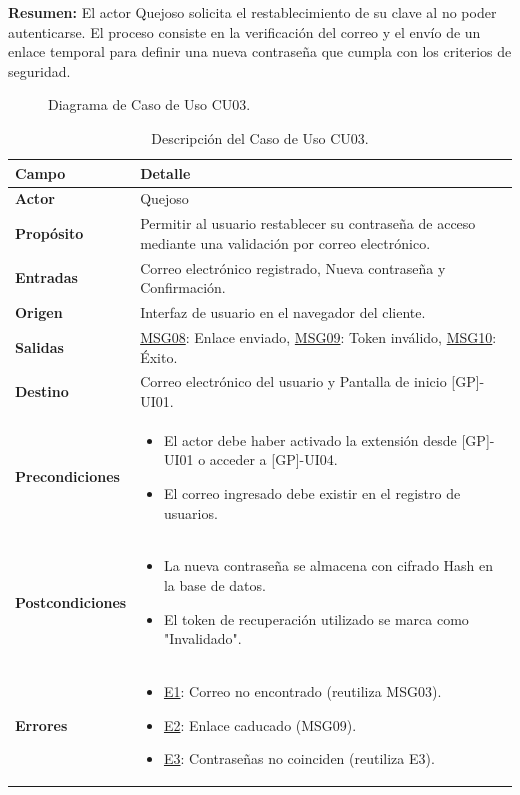 \begin{appendices}
\textbf{Resumen:} 
El actor Quejoso solicita el restablecimiento de su clave al no poder autenticarse. El proceso consiste en la verificación del correo y el envío de un enlace temporal para definir una nueva contraseña que cumpla con los criterios de seguridad.

\begin{figure}[htbp]
    \centering
    \figCUtres
    \caption{Diagrama de Caso de Uso CU03.}
    \label{fig:cu03}
\end{figure}

\begin{table}[htbp]
\centering
\small
\begin{tabular}{|p{3.5cm}|p{10.5cm}|}
\hline
\rowcolor[HTML]{EFEFEF} 
\textbf{Campo} & \textbf{Detalle} \\ \hline
\textbf{Actor} & Quejoso \\ \hline
\textbf{Propósito} & Permitir al usuario restablecer su contraseña de acceso mediante una validación por correo electrónico. \\ \hline
\textbf{Entradas} & Correo electrónico registrado, Nueva contraseña y Confirmación. \\ \hline
\textbf{Origen} & Interfaz de usuario en el navegador del cliente. \\ \hline
\textbf{Salidas} & \hyperlink{msg:MSG08}{MSG08}: Enlace enviado, \hyperlink{msg:MSG09}{MSG09}: Token inválido, \hyperlink{msg:MSG10}{MSG10}: Éxito. \\ \hline
\textbf{Destino} & Correo electrónico del usuario y Pantalla de inicio [GP]-UI01. \\ \hline
\textbf{Precondiciones} & 
\begin{itemize}[nosep, leftmargin=*]
    \item El actor debe haber activado la extensión desde [GP]-UI01 o acceder a [GP]-UI04.
    \item El correo ingresado debe existir en el registro de usuarios.
\end{itemize} \\ \hline
\textbf{Postcondiciones} & 
\begin{itemize}[nosep, leftmargin=*]
    \item La nueva contraseña se almacena con cifrado Hash en la base de datos.
    \item El token de recuperación utilizado se marca como "Invalidado".
\end{itemize} \\ \hline
\textbf{Errores} & 
\begin{itemize}[nosep, leftmargin=*]
    \item \hyperlink{msg:MSG03}{E1}: Correo no encontrado (reutiliza MSG03).
    \item \hyperlink{err:E6}{E2}: Enlace caducado (MSG09).
    \item \hyperlink{err:E3}{E3}: Contraseñas no coinciden (reutiliza E3).
\end{itemize} \\ \hline
\end{tabular}
\caption{Descripción del Caso de Uso CU03.}
\label{tab:cu03_especificacion}
\end{table}


\end{appendices}
